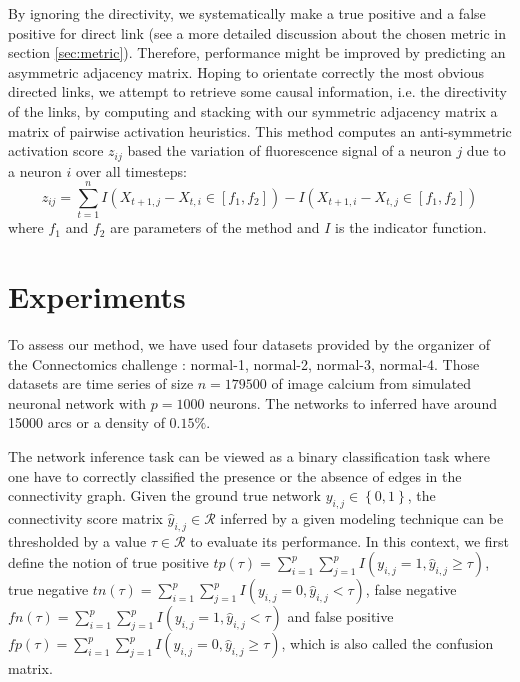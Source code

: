\documentclass[wcp]{jmlr}
\begin{document}
By ignoring the directivity, we systematically
make a true positive and a false positive for direct link (see a more detailed
discussion about the chosen metric in section \ref{sec:metric}). Therefore,
performance might be improved by predicting an asymmetric adjacency matrix.
Hoping to orientate correctly the most obvious directed links, we attempt to
retrieve some causal information, i.e. the directivity of the links, by computing
and stacking with our symmetric adjacency matrix a matrix of pairwise activation
heuristics. This method computes an anti-symmetric activation score $z_{ij}$
based the variation of fluorescence signal of a neuron $j$ due to a neuron $i$
over all timesteps:
\[
z_{ij} = \sum_{t=1}^n I(X_{t+1,j} - X_{t, i} \in [f_1, f_2]) -  I(X_{t+1,i} - X_{t, j} \in [f_1, f_2])
\]
where $f_1$ and $f_2$ are parameters of the method and $I$ is the
indicator function. %


\section{Experiments}
To assess our method, we have used four datasets provided by the organizer
of the Connectomics challenge : normal-1, normal-2, normal-3, normal-4. Those
datasets are time series of size $n=179500$ of image calcium from simulated
neuronal network \cite{stetter2012model} with $p=1000$ neurons. The networks
to inferred have around 15000 arcs or a density of $0.15\%$.

The network inference task can be viewed as a binary classification task
where one have to correctly classified the presence or the absence of edges
in the connectivity graph. Given the ground true network
$y_{i,j} \in \left\{0, 1\right\}$, the connectivity score matrix
$\hat{y}_{i,j} \in \mathcal{R}$ inferred by a given modeling technique
can be thresholded by a value $\tau \in \mathcal{R}$ to evaluate its performance. In this
context, we first define the notion of
true positive $tp(\tau) = \sum_{i=1}^p \sum_{j=1}^p I(y_{i,j} = 1, \hat{y}_{i,j} \geq \tau)$,
true negative $tn(\tau) = \sum_{i=1}^p \sum_{j=1}^p I(y_{i,j} = 0, \hat{y}_{i,j} < \tau)$,
false negative $fn(\tau) = \sum_{i=1}^p \sum_{j=1}^p I(y_{i,j} = 1, \hat{y}_{i,j} < \tau)$ and
false positive $fp(\tau) = \sum_{i=1}^p \sum_{j=1}^p I(y_{i,j} = 0, \hat{y}_{i,j} \geq \tau)$,
which is also called the confusion matrix.
\end{document}
